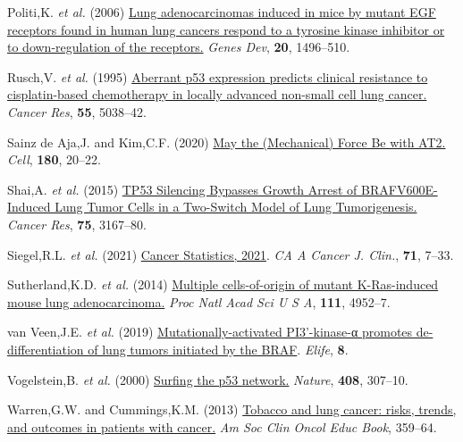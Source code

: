 \begin{CSLReferences}{1}{0}
\leavevmode{}%
Politi,K. \emph{et al.} (2006) \href{https://doi.org/10.1101/gad.1417406}{Lung adenocarcinomas induced in mice by mutant EGF receptors found in human lung cancers respond to a tyrosine kinase inhibitor or to down-regulation of the receptors.} \emph{Genes Dev}, \textbf{20}, 1496--510.

\leavevmode{}%
Rusch,V. \emph{et al.} (1995) \href{https://www.ncbi.nlm.nih.gov/pubmed/7585548}{Aberrant p53 expression predicts clinical resistance to cisplatin-based chemotherapy in locally advanced non-small cell lung cancer.} \emph{Cancer Res}, \textbf{55}, 5038--42.

\leavevmode{}%
Sainz de Aja,J. and Kim,C.F. (2020) \href{https://doi.org/10.1016/j.cell.2019.12.020}{May the (Mechanical) Force Be with AT2.} \emph{Cell}, \textbf{180}, 20--22.

\leavevmode{}%
Shai,A. \emph{et al.} (2015) \href{https://doi.org/10.1158/0008-5472.can-14-3701}{TP53 Silencing Bypasses Growth Arrest of BRAFV600E-Induced Lung Tumor Cells in a Two-Switch Model of Lung Tumorigenesis.} \emph{Cancer Res}, \textbf{75}, 3167--80.

\leavevmode{}%
Siegel,R.L. \emph{et al.} (2021) \href{https://doi.org/10.3322/caac.21654}{Cancer Statistics, 2021}. \emph{CA A Cancer J. Clin.}, \textbf{71}, 7--33.

\leavevmode{}%
Sutherland,K.D. \emph{et al.} (2014) \href{https://doi.org/10.1073/pnas.1319963111}{Multiple cells-of-origin of mutant K-Ras-induced mouse lung adenocarcinoma.} \emph{Proc Natl Acad Sci U S A}, \textbf{111}, 4952--7.

\leavevmode{}%
van Veen,J.E. \emph{et al.} (2019) \href{https://doi.org/10.7554/elife.43668}{Mutationally-activated PI3'-kinase-α promotes de-differentiation of lung tumors initiated by the BRAF}. \emph{Elife}, \textbf{8}.

\leavevmode{}%
Vogelstein,B. \emph{et al.} (2000) \href{https://doi.org/10.1038/35042675}{Surfing the p53 network.} \emph{Nature}, \textbf{408}, 307--10.

\leavevmode{}%
Warren,G.W. and Cummings,K.M. (2013) \href{https://doi.org/10.14694/edbook_am.2013.33.359}{Tobacco and lung cancer: risks, trends, and outcomes in patients with cancer.} \emph{Am Soc Clin Oncol Educ Book}, 359--64.


\end{CSLReferences}
